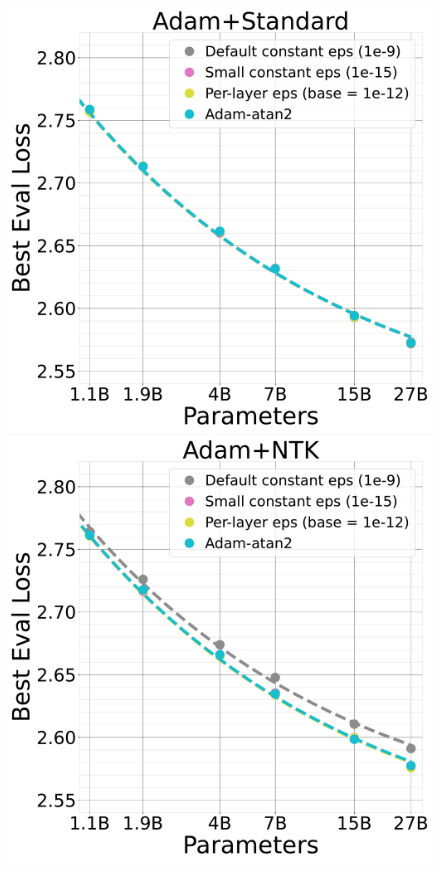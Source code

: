\documentclass{article}
\theoremstyle{plain}
\theoremstyle{definition}
\theoremstyle{remark}
\begin{document}
\begin{figure}[ht]
    \begin{center}
        \includegraphics[width=0.48\linewidth, trim={0, 0, 0, 0},clip]{icml2024/figures/epsilon/stp_epsilon_eval_loss_comparisons_zoom6.pdf}
        \hfill
        \includegraphics[width=0.48\linewidth, trim={0, 0, 0, 0},clip]{icml2024/figures/epsilon/ntk_epsilon_eval_loss_comparisons_zoom6.pdf}
       
        \figvspace
       

\end{center}
\end{figure}
\end{document}
